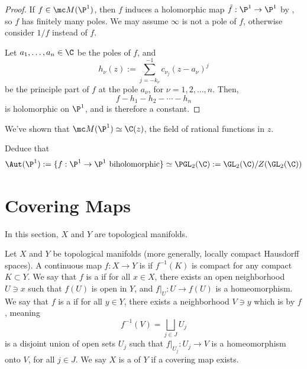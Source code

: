 \documentclass[11pt]{report}
\begin{document}
\begin{proof}
    If $f \in \mc M(\P^1)$, then $f$ induces a holomorphic map $\tilde f:\P^1 \to \P^1$ by , so $f$ has finitely many poles. We may assume $\infty$ is not a pole of $f$, otherwise consider $1/f$ instead of $f$.

    Let $a_1,\dots,a_n \in \C$ be the poles of $f$, and 
    $$h_\nu(z) := \sum_{j=-k_\nu}^{-1}c_{\nu_j}(z-a_\nu)^j$$
    be the principle part of $f$ at the pole $a_\nu$, for $\nu=1,2,\dots,n$. Then,
    $$f-h_1-h_2 - \cdots - h_n$$
    is holomorphic on $\P^1$, and is therefore a constant.
\end{proof}

We've shown that $\mc M(\P^1) \simeq \C(z)$, the field of rational functions in $z$.

\begin{exercise}
    Deduce that 
    $$\Aut(\P^1) := \{f:\P^1 \to \P^1 \text{ biholomorphic}\} \simeq \PGL_2(\C) := \GL_2(\C) /Z(\GL_2(\C))$$
\end{exercise}

\section{Covering Maps}
In this section, $X$ and $Y$ are topological manifolds.

\begin{defn}
    Let $X$ and $Y$ be topological manifolds (more generally, locally compact Hausdorff spaces). A continuous map $f:X \to Y$ is  if $f^{-1}(K)$ is compact for any compact $K \subset Y$. We say that $f$ is a  if for all $x \in X$, there exists an open neighborhood $U \ni x$ such that $f(U)$ is open in $Y$, and $f|_U:U \to f(U)$ is a homeomorphism. We say that $f$ is a  if for all $y \in Y$, there exists a neighborhood $V \ni y$ which is  by $f$, meaning 
    $$f^{-1}(V) = \bigsqcup_{j \in J}U_j$$
    is a disjoint union of open sets $U_j$ such that $f|_{U_j}:U_j \to V$ is a homeomorphism onto $V$, for all $j \in J$. We say $X$ is a  of $Y$ if a covering map exists.
\end{defn}
\end{document}
